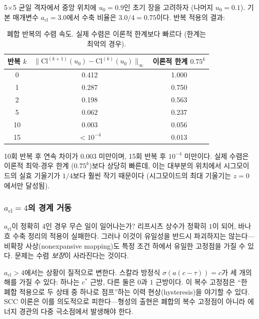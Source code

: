 \begin{example}
5$\times$5 균일 격자에서 중앙 위치에 $u_0 = 0.9$인 초기 장을 고려하자 (나머지 $u_0 = 0.1$). 기본 매개변수 $a_{\mathrm{cl}} = 3.0$에서 수축 비율은 $3.0/4 = 0.75$이다. 반복 적용의 결과:

\begin{table}[h]
\centering
\begin{tabular}{ccc}
\hline
\textbf{반복 $k$} & $\|\mathrm{Cl}^{(k+1)}(u_0) - \mathrm{Cl}^{(k)}(u_0)\|_\infty$ & \textbf{이론적 한계} $0.75^k$ \\
\hline
0 & 0.412 & 1.000 \\
1 & 0.287 & 0.750 \\
2 & 0.198 & 0.563 \\
5 & 0.062 & 0.237 \\
10 & 0.003 & 0.056 \\
15 & $< 10^{-4}$ & 0.013 \\
\hline
\end{tabular}
\caption{폐합 반복의 수렴 속도. 실제 수렴은 이론적 한계보다 빠르다 (한계는 최악의 경우).}
\label{tab:contraction-rate}
\end{table}

10회 반복 후 연속 차이가 $0.003$ 미만이며, 15회 반복 후 $10^{-4}$ 미만이다. 실제 수렴은 이론적 최악-경우 한계 ($0.75^k$)보다 상당히 빠른데, 이는 대부분의 위치에서 시그모이드의 실효 기울기가 $1/4$보다 훨씬 작기 때문이다 (시그모이드의 최대 기울기는 $z = 0$에서만 달성됨).
\end{example}

\subsubsection{$a_{\mathrm{cl}} = 4$의 경계 거동}

$a_{\mathrm{cl}}$이 정확히 $4$인 경우 무슨 일이 일어나는가? 리프시츠 상수가 정확히 $1$이 되어, 바나흐 수축 정리의 적용이 실패한다. 그러나 이것이 유일성을 반드시 파괴하지는 않는다---비확장 사상(nonexpansive mapping)도 특정 조건 하에서 유일한 고정점을 가질 수 있다. 문제는 수렴 \emph{보장}이 사라진다는 것이다.

$a_{\mathrm{cl}} > 4$에서는 상황이 질적으로 변한다. 스칼라 방정식 $\sigma(a(c - \tau)) = c$가 세 개의 해를 가질 수 있다: 하나는 $c^*$ 근방, 다른 둘은 $0$과 $1$ 근방이다. 이 복수 고정점은 ``한 폐합 적용으로 두 상태 중 하나로 점프''하는 이력 현상(hysteresis)을 야기할 수 있다. SCC 이론은 이를 의도적으로 피한다---형성의 출현은 폐합의 복수 고정점이 아니라 에너지 경관의 다중 극소점에서 발생해야 한다.


